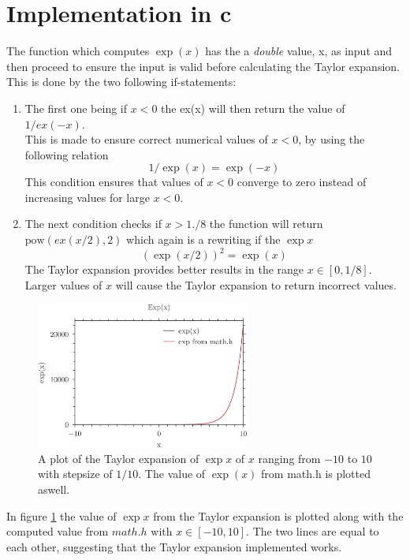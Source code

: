 \documentclass{article}
\begin{document}
\section*{Implementation in c}
The function which computes $\exp{(x)}$ has the a \textit{double} value, x, as input and then proceed to ensure the input is valid before calculating the Taylor expansion. This is done by the two following if-statements:
\begin{enumerate}
    \item The first one being if $x<0$ the ex(x) will then return the value of $1/ex(-x)$.\\This is made to ensure correct numerical values of $x<0$, by using the following relation
    \begin{equation}
        1/\exp{(x)} = \exp{(-x)}
    \end{equation}
    This condition ensures that values of $x<0$ converge to zero instead of increasing values for large $x<0$.
    \item The next condition checks if $x>1./8$ the function will return $\text{pow}(ex(x/2),2)$ which again is a rewriting if the $\exp{x}$
    \begin{equation}
        \left(\exp{(x/2)}\right)^2 = \exp{(x)}
    \end{equation}
	The Taylor expansion provides better results in the range $x\in [0,1/8]$. Larger values of $x$ will cause the Taylor expansion to return incorrect values.
\end{enumerate}
\begin{figure}[h!]
    \centering
    \includegraphics[width=70mm]{exp.png}
    \caption{A plot of the Taylor expansion of $\exp{x}$ of $x$ ranging from $-10$ to $10$ with stepsize of $1/10$. The value of $\exp{(x)}$ from math.h is plotted aswell.}
    \label{TaylorPlot}
\end{figure}
In figure \ref{TaylorPlot} the value of $\exp{x}$ from the Taylor expansion is plotted along with the computed value from $math.h$ with $x\in[-10,10]$. The two lines are equal to each other, suggesting that the Taylor expansion implemented works.\\\\
\end{document}
